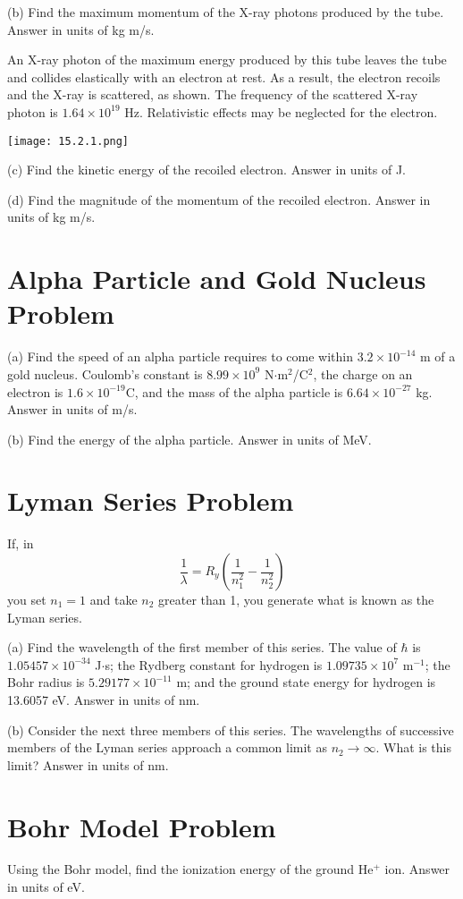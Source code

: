 \documentclass[../physics12.tex]{subfiles}
\begin{document}
(b) Find the maximum momentum of the X-ray photons produced by the tube. Answer in units of kg m/s.

An X-ray photon of the maximum energy produced by this tube leaves the tube and collides elastically with an electron at rest. As a result, the electron recoils and the X-ray is scattered, as shown. The frequency of the scattered 
X-ray photon is $1.64\times 10^{19}$ Hz. Relativistic effects may be neglected for the electron.
\begin{center}
    \texttt{[image: 15.2.1.png]}
\end{center}
(c) Find the kinetic energy of the recoiled electron. Answer in units of J.

(d) Find the magnitude of the momentum of the recoiled electron. Answer in units of kg m/s.

\section{Alpha Particle and Gold Nucleus Problem}
(a) Find the speed of an alpha particle requires to come within $3.2\times 10^{-14}$ m of a gold nucleus. Coulomb's constant is $8.99\times 10^9$ N$\cdot$m$^2$/C$^2$, 
the charge on an electron is $1.6\times 10^{-19}$C, and the mass of the alpha particle is $6.64\times 10^{-27}$ kg. Answer in units of m/s.

(b) Find the energy of the alpha particle. Answer in units of MeV.

\section{Lyman Series Problem}
If, in 
\[ \frac{1}{\lambda} = R_y \left(\frac{1}{n_1^2}-\frac{1}{n_2^2}\right) \]
you set $n_1 = 1$ and take $n_2$ greater than 1, you generate what is known as the Lyman series.

(a) Find the wavelength of the first member of this series. The value of $\hbar$ is $1.05457\times 10^{-34}$ J$\cdot$s; the Rydberg constant for 
hydrogen is $1.09735\times 10^7$ m$^{-1}$; the Bohr radius is $5.29177\times 10^{-11}$ m; and the ground state energy for hydrogen is 13.6057 eV. Answer in units of nm.

(b) Consider the next three members of this series. The wavelengths of successive members of the Lyman series approach a common limit as $n_2 \rightarrow \infty$. What is this limit? Answer in units of nm.

\section{Bohr Model Problem}
Using the Bohr model, find the ionization energy of the ground He$^+$ ion. Answer in units of eV.
\end{document}
